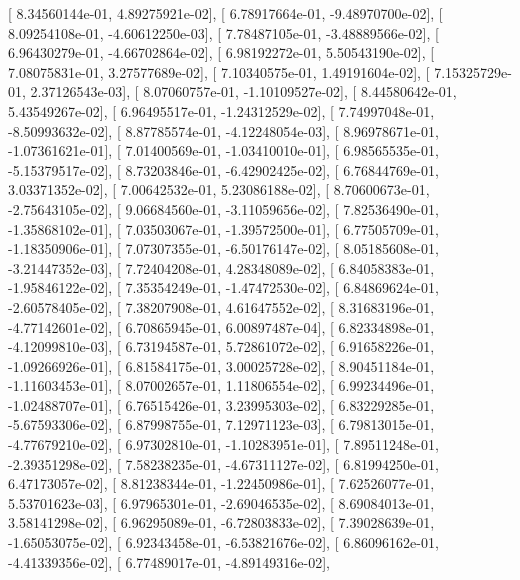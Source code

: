 \documentclass{article}
\begin{document}
       [  8.34560144e-01,   4.89275921e-02],
       [  6.78917664e-01,  -9.48970700e-02],
       [  8.09254108e-01,  -4.60612250e-03],
       [  7.78487105e-01,  -3.48889566e-02],
       [  6.96430279e-01,  -4.66702864e-02],
       [  6.98192272e-01,   5.50543190e-02],
       [  7.08075831e-01,   3.27577689e-02],
       [  7.10340575e-01,   1.49191604e-02],
       [  7.15325729e-01,   2.37126543e-03],
       [  8.07060757e-01,  -1.10109527e-02],
       [  8.44580642e-01,   5.43549267e-02],
       [  6.96495517e-01,  -1.24312529e-02],
       [  7.74997048e-01,  -8.50993632e-02],
       [  8.87785574e-01,  -4.12248054e-03],
       [  8.96978671e-01,  -1.07361621e-01],
       [  7.01400569e-01,  -1.03410010e-01],
       [  6.98565535e-01,  -5.15379517e-02],
       [  8.73203846e-01,  -6.42902425e-02],
       [  6.76844769e-01,   3.03371352e-02],
       [  7.00642532e-01,   5.23086188e-02],
       [  8.70600673e-01,  -2.75643105e-02],
       [  9.06684560e-01,  -3.11059656e-02],
       [  7.82536490e-01,  -1.35868102e-01],
       [  7.03503067e-01,  -1.39572500e-01],
       [  6.77505709e-01,  -1.18350906e-01],
       [  7.07307355e-01,  -6.50176147e-02],
       [  8.05185608e-01,  -3.21447352e-03],
       [  7.72404208e-01,   4.28348089e-02],
       [  6.84058383e-01,  -1.95846122e-02],
       [  7.35354249e-01,  -1.47472530e-02],
       [  6.84869624e-01,  -2.60578405e-02],
       [  7.38207908e-01,   4.61647552e-02],
       [  8.31683196e-01,  -4.77142601e-02],
       [  6.70865945e-01,   6.00897487e-04],
       [  6.82334898e-01,  -4.12099810e-03],
       [  6.73194587e-01,   5.72861072e-02],
       [  6.91658226e-01,  -1.09266926e-01],
       [  6.81584175e-01,   3.00025728e-02],
       [  8.90451184e-01,  -1.11603453e-01],
       [  8.07002657e-01,   1.11806554e-02],
       [  6.99234496e-01,  -1.02488707e-01],
       [  6.76515426e-01,   3.23995303e-02],
       [  6.83229285e-01,  -5.67593306e-02],
       [  6.87998755e-01,   7.12971123e-03],
       [  6.79813015e-01,  -4.77679210e-02],
       [  6.97302810e-01,  -1.10283951e-01],
       [  7.89511248e-01,  -2.39351298e-02],
       [  7.58238235e-01,  -4.67311127e-02],
       [  6.81994250e-01,   6.47173057e-02],
       [  8.81238344e-01,  -1.22450986e-01],
       [  7.62526077e-01,   5.53701623e-03],
       [  6.97965301e-01,  -2.69046535e-02],
       [  8.69084013e-01,   3.58141298e-02],
       [  6.96295089e-01,  -6.72803833e-02],
       [  7.39028639e-01,  -1.65053075e-02],
       [  6.92343458e-01,  -6.53821676e-02],
       [  6.86096162e-01,  -4.41339356e-02],
       [  6.77489017e-01,  -4.89149316e-02],
\end{document}
